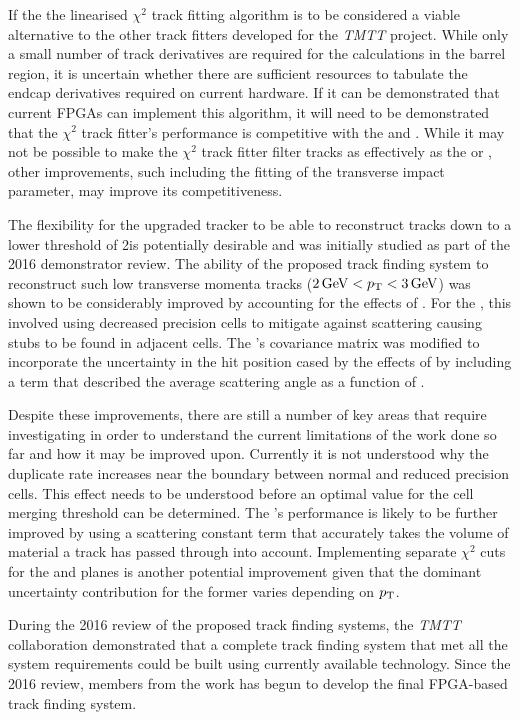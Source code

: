 If the the linearised $\chi^{2}$ track fitting algorithm is to be considered a viable alternative to the other track fitters developed for the \emph{TMTT} project.
While only a small number of track derivatives are required for the calculations in the barrel region, it is uncertain whether there are sufficient resources to tabulate the endcap derivatives required on current hardware.
If it can be demonstrated that current FPGAs can implement this algorithm, it will need to be demonstrated that the $\chi^{2}$ track fitter's performance is competitive with the \KF and \LR.
While it may not be possible to make the $\chi^{2}$ track fitter filter tracks as effectively as the \KF or \LR , other improvements, such including the fitting of the transverse impact parameter, may improve its competitiveness.


The flexibility for the upgraded tracker to be able to reconstruct tracks down to a lower \pT threshold of 2\GeV is potentially desirable and was initially studied as part of the 2016 demonstrator review.
The ability of the proposed track finding system to reconstruct such low transverse momenta tracks ($2\,\text{Ge\hspace{-.08em}V} < p_{\mathrm{T}} < 3\,\text{Ge\hspace{-.08em}V}$) was shown to be considerably improved by accounting for the effects of \MS. 
For the \HT, this involved using decreased precision \HT cells to mitigate against scattering causing stubs to be found in adjacent cells.
The \KF's covariance matrix was modified to incorporate the uncertainty in the hit position cased by the effects of \MS by including a term that described the average scattering angle as a function of \pT.

Despite these improvements, there are still a number of key areas that require investigating in order to understand the current limitations of the work done so far and how it may be improved upon.
Currently it is not understood why the duplicate rate increases near the boundary between normal and reduced precision \HT cells.
This effect needs to be understood before an optimal value for the cell merging threshold can be determined.
The \KF's performance is likely to be further improved by using a scattering constant term that accurately takes the volume of material a track has passed through into account.
Implementing separate \KF $\chi^{2}$ cuts for the \rphi and \rz planes is another potential improvement given that the dominant uncertainty contribution for the former varies depending on $p_{\mathrm{T}}$.

During the 2016 review of the proposed track finding systems, the \emph{TMTT} collaboration demonstrated that a complete track finding system that met all the system requirements could be built using currently available technology.
Since the 2016 review, members from the work has begun to develop the final FPGA-based track finding system.

